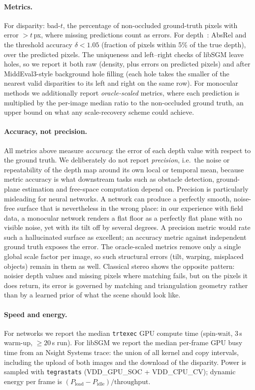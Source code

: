 \documentclass[10pt,twocolumn]{article}
\begin{document}
\paragraph{Metrics.} For disparity: bad-$t$, the percentage of non-occluded ground-truth pixels
with error $>t$\,px, where missing predictions count as errors. For depth~\cite{eigen2014depth}:
AbsRel and the threshold accuracy $\delta<1.05$ (fraction of pixels within 5\% of the true depth),
over the predicted pixels. The uniqueness and left--right checks of libSGM leave holes,
so we report it both raw (density, plus errors on predicted pixels) and after
MiddEval3-style background hole filling (each hole takes the smaller of the nearest valid
disparities to its left and right on the same row). For monocular methods we additionally report
\emph{oracle-scaled} metrics, where each prediction is multiplied by the per-image median ratio to the
non-occluded ground truth, an upper bound on what any scale-recovery scheme could achieve.

\paragraph{Accuracy, not precision.}
All metrics above measure \emph{accuracy}: the error of each depth value with respect to the ground
truth. We deliberately do not report \emph{precision}, i.e.\ the noise or repeatability of the depth
map around its own local or temporal mean, because metric accuracy is what downstream tasks such as
obstacle detection, ground-plane estimation and free-space computation depend on. Precision is
particularly misleading for neural networks. A network can produce a perfectly smooth, noise-free
surface that is nevertheless in the wrong place: in our experience with field data, a monocular
network renders a flat floor as a perfectly flat plane with no visible noise, yet with its tilt off
by several degrees. A precision metric would rate such a hallucinated surface as excellent; an
accuracy metric against independent ground truth exposes the error. The oracle-scaled metrics remove
only a single global scale factor per image, so such structural errors (tilt, warping, misplaced
objects) remain in them as well. Classical stereo shows the opposite pattern: noisier depth values
and missing pixels where matching fails, but on the pixels it does return, its error is governed by
matching and triangulation geometry rather than by a learned prior of what the scene should look
like.

\paragraph{Speed and energy.} For networks we report the median \texttt{trtexec} GPU compute time
(spin-wait, 3\,s warm-up, ${\geq}20$\,s run). For libSGM we report the median
per-frame GPU busy time from an Nsight Systems trace: the union of all kernel and copy intervals,
including the upload of both images and the download of the disparity. Power is
sampled with \texttt{tegrastats} (VDD\_GPU\_SOC + VDD\_CPU\_CV); dynamic energy per frame is
$(P_\text{load}-P_\text{idle})/\text{throughput}$.
\end{document}
